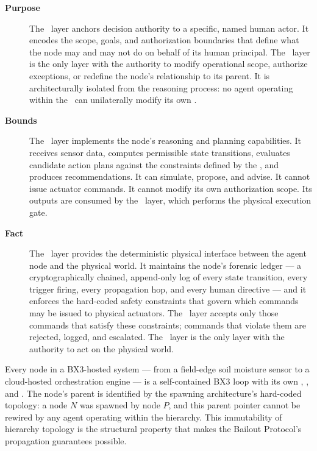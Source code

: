 \begin{description}
\item[\textbf{Purpose}] The \purpose\ layer anchors decision authority to a specific, named human actor. It encodes the scope, goals, and authorization boundaries that define what the node may and may not do on behalf of its human principal. The \purpose\ layer is the only layer with the authority to modify operational scope, authorize exceptions, or redefine the node's relationship to its parent. It is architecturally isolated from the reasoning process: no agent operating within the \bounds\ can unilaterally modify its own \purpose.

\item[\textbf{Bounds}] The \bounds\ layer implements the node's reasoning and planning capabilities. It receives sensor data, computes permissible state transitions, evaluates candidate action plans against the constraints defined by the \purpose, and produces recommendations. It can simulate, propose, and advise. It cannot issue actuator commands. It cannot modify its own authorization scope. Its outputs are consumed by the \fact\ layer, which performs the physical execution gate.

\item[\textbf{Fact}] The \fact\ layer provides the deterministic physical interface between the agent node and the physical world. It maintains the node's forensic ledger — a cryptographically chained, append-only log of every state transition, every trigger firing, every propagation hop, and every human directive — and it enforces the hard-coded safety constraints that govern which commands may be issued to physical actuators. The \fact\ layer accepts only those commands that satisfy these constraints; commands that violate them are rejected, logged, and escalated. The \fact\ layer is the only layer with the authority to act on the physical world.
\end{description}

Every node in a BX3-hosted system — from a field-edge soil moisture sensor to a cloud-hosted orchestration engine — is a self-contained BX3 loop with its own \purpose, \bounds, and \fact. The node's parent is identified by the spawning architecture's hard-coded topology: a node $N$ was spawned by node $P$, and this parent pointer cannot be rewired by any agent operating within the hierarchy. This immutability of hierarchy topology is the structural property that makes the Bailout Protocol's propagation guarantees possible.

